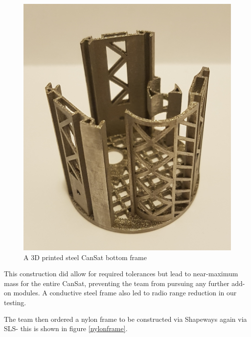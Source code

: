 \documentclass[]{report}
\begin{document}
		\begin{figure}[h]
			\hfill\includegraphics[scale=0.15]{steel_frame.jpg}\hspace*{\fill}
			\caption{A 3D printed steel CanSat bottom frame}
			\label{steelframe}
		\end{figure}
		
		This construction did allow for required tolerances but lead to near-maximum mass for the entire CanSat, preventing the team from pursuing any further add-on modules. A conductive steel frame also led to radio range reduction in our testing.
		
		The team then ordered a nylon frame to be constructed via Shapeways again via SLS- this is shown in figure \ref{nylonframe}.
		
\end{document}
